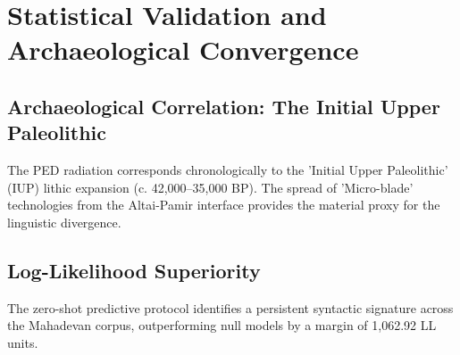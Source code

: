 \chapter{Statistical Validation and Archaeological Convergence}
\section{Archaeological Correlation: The Initial Upper Paleolithic}
The PED radiation corresponds chronologically to the 'Initial Upper Paleolithic' (IUP) lithic expansion (c. 42,000--35,000 BP). The spread of 'Micro-blade' technologies from the Altai-Pamir interface provides the material proxy for the linguistic divergence.

\section{Log-Likelihood Superiority}
The zero-shot predictive protocol identifies a persistent syntactic signature across the Mahadevan corpus, outperforming null models by a margin of 1,062.92 LL units.

